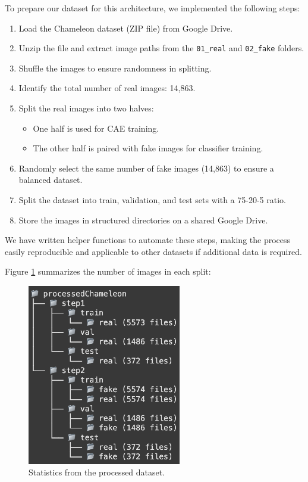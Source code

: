 \documentclass{article} %
\begin{document}
To prepare our dataset for this architecture, we implemented the following steps:
\begin{enumerate}
    \item Load the Chameleon dataset (ZIP file) from Google Drive.
    \item Unzip the file and extract image paths from the \texttt{01\_real} and \texttt{02\_fake} folders.
    \item Shuffle the images to ensure randomness in splitting.
    \item Identify the total number of real images: 14,863.
    \item Split the real images into two halves:
    \begin{itemize}
        \item One half is used for CAE training.
        \item The other half is paired with fake images for classifier training.
    \end{itemize}
    \item Randomly select the same number of fake images (14,863) to ensure a balanced dataset.
    \item Split the dataset into train, validation, and test sets with a 75-20-5 ratio.
    \item Store the images in structured directories on a shared Google Drive.
\end{enumerate}

We have written helper functions to automate these steps, making the process easily reproducible and applicable to other datasets if additional data is required.

Figure \ref{fig:cleaned_statistic} summarizes the number of images in each split:
\begin{figure}[h]
    \centering
    \includegraphics[width=0.6\textwidth]{figs/cleaned_statistic.png}
    \caption{Statistics from the processed dataset.}
    \label{fig:cleaned_statistic}
\end{figure}
\end{document}
